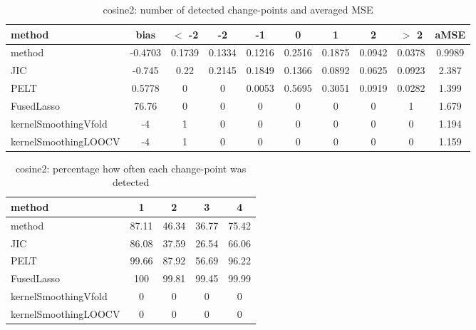 \begin{table}[ht]
\centering
\begin{tabular}{l|c|ccccccc|c}
  \hline
method & bias & $<$ -2 & -2 & -1 & 0 & 1 & 2 & $>$ 2 & aMSE \\ 
  \hline
method & -0.4703 & 0.1739 & 0.1334 & 0.1216 & 0.2516 & 0.1875 & 0.0942 & 0.0378 & 0.9989 \\ 
  JIC & -0.745 &  0.22 & 0.2145 & 0.1849 & 0.1366 & 0.0892 & 0.0625 & 0.0923 & 2.387 \\ 
  PELT & 0.5778 &     0 &     0 & 0.0053 & 0.5695 & 0.3051 & 0.0919 & 0.0282 & 1.399 \\ 
  FusedLasso & 76.76 &     0 &     0 &     0 &     0 &     0 &     0 &     1 & 1.679 \\ 
  kernelSmoothingVfold &    -4 &     1 &     0 &     0 &     0 &     0 &     0 &     0 & 1.194 \\ 
  kernelSmoothingLOOCV &    -4 &     1 &     0 &     0 &     0 &     0 &     0 &     0 & 1.159 \\ 
   \hline
\end{tabular}
\caption{cosine2: number of detected change-points and averaged MSE} 
\label{tab:cosine2Njumps}
\end{table}
\begin{table}[ht]
\centering
\begin{tabular}{l|cccc}
  \hline
method & 1 & 2 & 3 & 4 \\ 
  \hline
method &  87.11 &  46.34 &  36.77 &  75.42 \\ 
  JIC &  86.08 &  37.59 &  26.54 &  66.06 \\ 
  PELT &  99.66 &  87.92 &  56.69 &  96.22 \\ 
  FusedLasso &    100 &  99.81 &  99.45 &  99.99 \\ 
  kernelSmoothingVfold &      0 &      0 &      0 &      0 \\ 
  kernelSmoothingLOOCV &      0 &      0 &      0 &      0 \\ 
   \hline
\end{tabular}
\caption{cosine2: percentage how often each change-point was detected} 
\label{tab:cosine2Detections}
\end{table}
